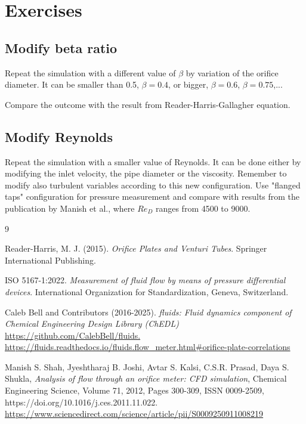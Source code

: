 \documentclass[
    parskip=half,      %
    DIV=12,            %
    headings=normal,   %
    fontsize=11pt,     %
    english            %
]{scrartcl}
\begin{document}
\section{Exercises}

\subsection{Modify beta ratio}

Repeat the simulation with a different value of $\beta$ by variation of the orifice diameter. It can be smaller than 0.5, $\beta=0.4$, or bigger, $\beta = 0.6$, 
$\beta = 0.75$,...

Compare the outcome with the result from Reader-Harris-Gallagher equation.

\subsection{Modify Reynolds}

Repeat the simulation with a smaller value of Reynolds. It can be done either by modifying
the inlet velocity, the pipe diameter or the viscosity. Remember to modify also
turbulent variables according to this new configuration. Use "flanged taps" configuration
for pressure measurement and compare with results from the publication by 
Manish et al.\cite{Manish2012}, where $Re_D$ ranges from 4500 to 9000.


\begin{thebibliography}{9}
	
	Reader-Harris, M. J. (2015). 
	\textit{Orifice Plates and Venturi Tubes}. 
	Springer International Publishing.
	
	ISO 5167-1:2022. 
	\textit{Measurement of fluid flow by means of pressure differential devices}. 
	International Organization for Standardization, Geneva, Switzerland.
	
	Caleb Bell and Contributors (2016-2025). \textit{fluids: Fluid dynamics component of Chemical Engineering Design Library (ChEDL)}
	\url{https://github.com/CalebBell/fluids.}
	\url{https://fluids.readthedocs.io/fluids.flow_meter.html#orifice-plate-correlations}
	
	Manish S. Shah, Jyeshtharaj B. Joshi, Avtar S. Kalsi, C.S.R. Prasad, Daya S. Shukla,
	\textit{Analysis of flow through an orifice meter: CFD simulation},
	Chemical Engineering Science,
	Volume 71,
	2012,
	Pages 300-309,
	ISSN 0009-2509,
	https://doi.org/10.1016/j.ces.2011.11.022.
	\url{https://www.sciencedirect.com/science/article/pii/S0009250911008219}
\end{thebibliography}



\end{document}
